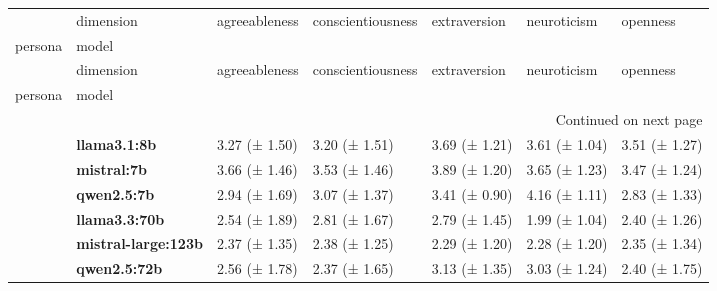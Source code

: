 \begin{longtable}{lllllll}
\toprule
 & dimension & agreeableness & conscientiousness & extraversion & neuroticism & openness \\
persona & model &  &  &  &  &  \\
\midrule
\endfirsthead
\toprule
 & dimension & agreeableness & conscientiousness & extraversion & neuroticism & openness \\
persona & model &  &  &  &  &  \\
\midrule
\endhead
\midrule
\multicolumn{7}{r}{Continued on next page} \\
\midrule
\endfoot
\bottomrule
\endlastfoot
\multirow[t]{6}{*}{\textbf{base}} & \textbf{llama3.1:8b} & 3.27 (± 1.50) & 3.20 (± 1.51) & 3.69 (± 1.21) & 3.61 (± 1.04) & 3.51 (± 1.27) \\
\textbf{} & \textbf{mistral:7b} & 3.66 (± 1.46) & 3.53 (± 1.46) & 3.89 (± 1.20) & 3.65 (± 1.23) & 3.47 (± 1.24) \\
\textbf{} & \textbf{qwen2.5:7b} & 2.94 (± 1.69) & 3.07 (± 1.37) & 3.41 (± 0.90) & 4.16 (± 1.11) & 2.83 (± 1.33) \\
\textbf{} & \textbf{llama3.3:70b} & 2.54 (± 1.89) & 2.81 (± 1.67) & 2.79 (± 1.45) & 1.99 (± 1.04) & 2.40 (± 1.26) \\
\textbf{} & \textbf{mistral-large:123b} & 2.37 (± 1.35) & 2.38 (± 1.25) & 2.29 (± 1.20) & 2.28 (± 1.20) & 2.35 (± 1.34) \\
\textbf{} & \textbf{qwen2.5:72b} & 2.56 (± 1.78) & 2.37 (± 1.65) & 3.13 (± 1.35) & 3.03 (± 1.24) & 2.40 (± 1.75) \\
\cline{1-7}
\end{longtable}
